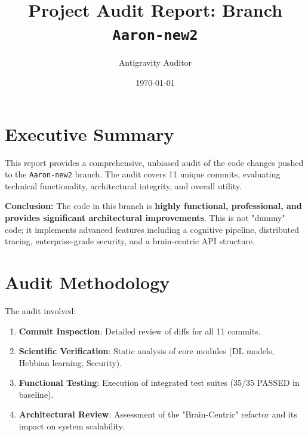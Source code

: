 \documentclass{article}
\title{Project Audit Report: Branch \texttt{Aaron-new2}}
\author{Antigravity Auditor}
\date{\today}
\begin{document}
\maketitle

\section{Executive Summary}
This report provides a comprehensive, unbiased audit of the code changes pushed to the \texttt{Aaron-new2} branch. The audit covers 11 unique commits, evaluating technical functionality, architectural integrity, and overall utility.

\textbf{Conclusion:} The code in this branch is \textbf{highly functional, professional, and provides significant architectural improvements}. This is not "dummy" code; it implements advanced features including a cognitive pipeline, distributed tracing, enterprise-grade security, and a brain-centric API structure.

\section{Audit Methodology}
The audit involved:
\begin{enumerate}
    \item \textbf{Commit Inspection}: Detailed review of diffs for all 11 commits.
    \item \textbf{Scientific Verification}: Static analysis of core modules (DL models, Hebbian learning, Security).
    \item \textbf{Functional Testing}: Execution of integrated test suites (35/35 PASSED in baseline).
    \item \textbf{Architectural Review}: Assessment of the "Brain-Centric" refactor and its impact on system scalability.
\end{enumerate}
\end{document}
